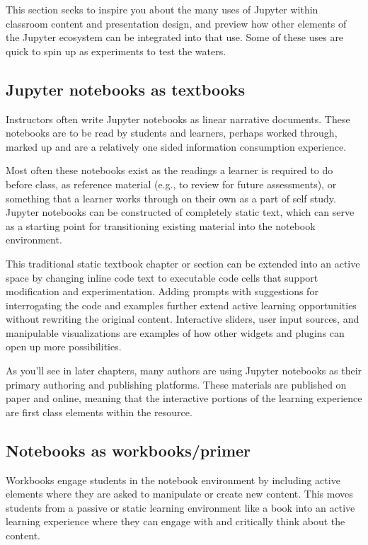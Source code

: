 \documentclass[]{book}
\begin{document}
This section seeks to inspire you about the many uses of Jupyter within
classroom content and presentation design, and preview how other elements of the
Jupyter ecosystem can be integrated into that use. Some of these uses are quick
to spin up as experiments to test the waters.

\hypertarget{jupyter-notebooks-as-textbooks}{%
\subsection{Jupyter notebooks as textbooks}\label{jupyter-notebooks-as-textbooks}}

Instructors often write Jupyter notebooks as linear narrative documents. These
notebooks are to be read by students and learners, perhaps worked through,
marked up and are a relatively one sided information consumption experience.

Most often these notebooks exist as the readings a learner is required to do
before class, as reference material (e.g., to review for future assessments), or
something that a learner works through on their own as a part of self study.
Jupyter notebooks can be constructed of completely static text, which can serve
as a starting point for transitioning existing material into the notebook
environment.

This traditional static textbook chapter or section can be extended into an
active space by changing inline code text to executable code cells that support
modification and experimentation. Adding prompts with suggestions for
interrogating the code and examples further extend active learning opportunities
without rewriting the original content. Interactive sliders, user input sources,
and manipulable visualizations are examples of how other widgets and plugins can
open up more possibilities.

As you'll see in later chapters, many authors are using Jupyter notebooks as
their primary authoring and publishing platforms. These materials are published
on paper and online, meaning that the interactive portions of the learning
experience are first class elements within the resource.

\hypertarget{notebooks-as-workbooksprimer}{%
\subsection{Notebooks as workbooks/primer}\label{notebooks-as-workbooksprimer}}

Workbooks engage students in the notebook environment by including active
elements where they are asked to manipulate or create new content. This moves
students from a passive or static learning environment like a book into an
active learning experience where they can engage with and critically think about
the content.
\end{document}
